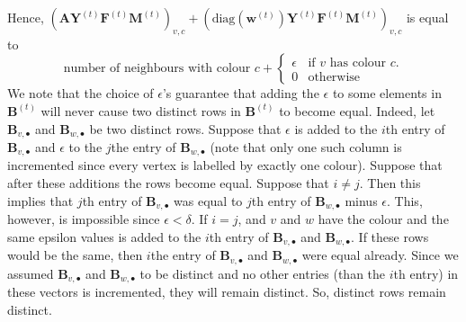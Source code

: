 Hence, $(\mathbf{A}\mathbf{Y}^{(t)}\mathbf{F}^{(t)}\mathbf{M}^{(t)})_{v,c} + (\text{diag}(\mathbf{w}^{(t)})\mathbf{Y}^{(t)}\mathbf{F}^{(t)}\mathbf{M}^{(t)})_{v,c}$
is equal to
\begin{equation}\label{eqn:count+epsilon}
\text{number of neighbours with colour $c$} +  \begin{cases} \epsilon & \text{if $v$ has colour $c$.}\\0 &\text{otherwise}
\end{cases}
\end{equation}
We note that the choice of $\epsilon$'s guarantee that adding the $\epsilon$
to some elements in $\mathbf{B}^{(t)}$ will never cause two distinct rows in
$\mathbf{B}^{(t)}$ to become equal. Indeed, let $\mathbf{B}_{v,\bullet}$ and
$\mathbf{B}_{w,\bullet}$ be two distinct rows. Suppose that $\epsilon$ is
added to the $i$th entry of  $\mathbf{B}_{v,\bullet}$  and $\epsilon$ to the
$j$the entry of $\mathbf{B}_{w,\bullet}$ (note that only one such column is
incremented since every vertex is labelled by exactly one colour).
Suppose that after these
additions the rows become equal. Suppose that $i\neq j$. Then this implies
that $j$th entry of $\mathbf{B}_{v,\bullet}$ was equal to $j$th entry of
$\mathbf{B}_{w,\bullet}$ minus $\epsilon$. This, however, is impossible since
$\epsilon<\delta$. If $i=j$, and $v$ and $w$ have the colour and the same
epsilon values is added to the $i$th entry of $\mathbf{B}_{v,\bullet}$ and
$\mathbf{B}_{w,\bullet}$. If these rows would be the same, then $i$the entry
of $\mathbf{B}_{v,\bullet}$ and $\mathbf{B}_{w,\bullet}$  were equal already.
Since we assumed  $\mathbf{B}_{v,\bullet}$ and $\mathbf{B}_{w,\bullet}$ to be
distinct and no other entries (than the $i$th entry) in these vectors is
incremented, they will remain distinct. So, distinct rows remain distinct.

